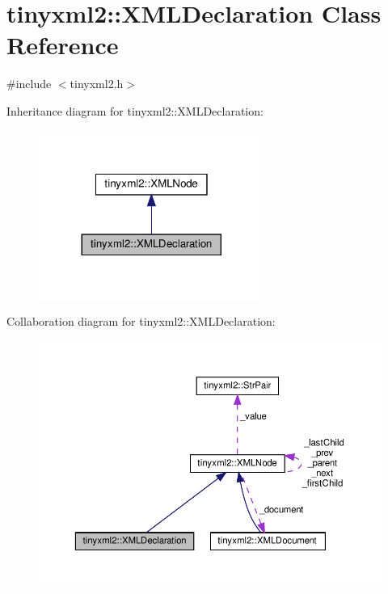 \hypertarget{classtinyxml2_1_1_x_m_l_declaration}{}\section{tinyxml2\+:\+:X\+M\+L\+Declaration Class Reference}
\label{classtinyxml2_1_1_x_m_l_declaration}


{\ttfamily \#include $<$tinyxml2.\+h$>$}



Inheritance diagram for tinyxml2\+:\+:X\+M\+L\+Declaration\+:
\nopagebreak
\begin{figure}[H]
\begin{center}
\leavevmode
\includegraphics[width=209pt]{classtinyxml2_1_1_x_m_l_declaration__inherit__graph}
\end{center}
\end{figure}


Collaboration diagram for tinyxml2\+:\+:X\+M\+L\+Declaration\+:
\nopagebreak
\begin{figure}[H]
\begin{center}
\leavevmode
\includegraphics[width=350pt]{classtinyxml2_1_1_x_m_l_declaration__coll__graph}
\end{center}
\end{figure}

